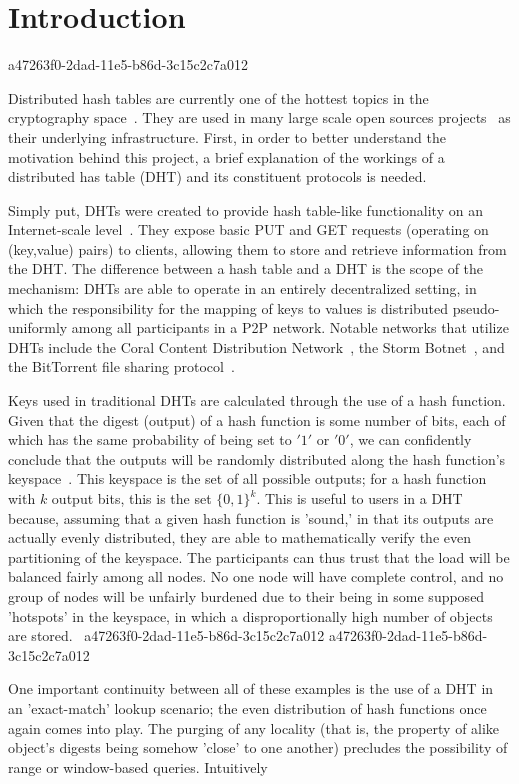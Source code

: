 \documentclass[12pt]{article}
\begin{document}
\section{Introduction}
a47263f0-2dad-11e5-b86d-3c15c2c7a012\par Distributed hash tables are currently one of the hottest topics in the cryptography space~\cite{Stoica:2001dj,Rowstron:2001ea,Ratnasamy:2001wn}. They are used in many large scale open sources projects~\cite{Freitas:2013tb,Xu:2010vs,Perfitt:2010fh} as their underlying infrastructure. First, in order to better understand the motivation behind this project, a brief explanation of the workings of a distributed has table (DHT) and its constituent protocols is needed.

\par Simply put, DHTs were created to provide hash table-like functionality on an Internet-scale level~\cite{Ratnasamy:2001wn}. They expose basic PUT and GET requests (operating on (key,value) pairs) to clients, allowing them to store and retrieve information from the DHT. The difference between a hash table and a DHT is the scope of the mechanism: DHTs are able to operate in an entirely decentralized setting, in which the responsibility for the mapping of keys to values is distributed pseudo-uniformly among all participants in a P2P network. Notable networks that utilize DHTs include the Coral Content Distribution Network~\cite{Freedman:2004vb}, the Storm Botnet~\cite{Holz:2008uk}, and the BitTorrent file sharing protocol~\cite{Cohen:y1_8mBnw}.

\par Keys used in traditional DHTs are calculated through the use of a hash function. Given that the digest (output) of a hash function is some number of bits, each of which has the same probability of being set to $'1'$ or $'0'$, we can confidently conclude that the outputs will be randomly distributed along the hash function's keyspace~. This keyspace is the set of all possible outputs; for a hash function with $k$ output bits, this is the set $\{0,1\}^k$. This is useful to users in a DHT because, assuming that a given hash function is 'sound,' in that its outputs are actually evenly distributed, they are able to mathematically verify the even partitioning of the keyspace. The participants can thus trust that the load will be balanced fairly among all nodes. No one node will have complete control, and no group of nodes will be unfairly burdened due to their being in some supposed 'hotspots' in the keyspace, in which a disproportionally high number of objects are stored.~
a47263f0-2dad-11e5-b86d-3c15c2c7a012
a47263f0-2dad-11e5-b86d-3c15c2c7a012\par One important continuity between all of these examples is the use of a DHT in an 'exact-match' lookup scenario; the even distribution of hash functions once again comes into play. The purging of any locality (that is, the property of alike object's digests being somehow 'close' to one another) precludes the possibility of range or window-based queries. Intuitively
\end{document}
